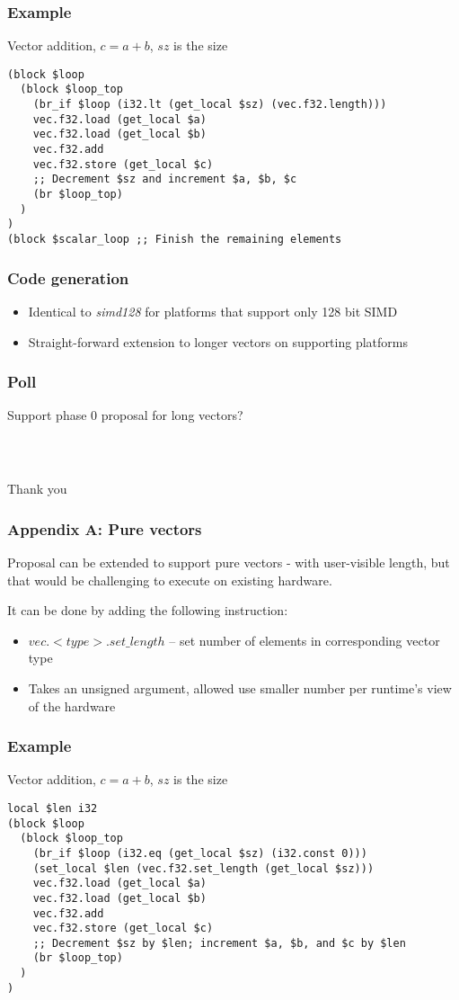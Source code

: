 \documentclass[t,aspectratio=169, xcolor={table}]{beamer}
\begin{document}
\begin{frame}[containsverbatim]
\frametitle{Example}
Vector addition, $c = a + b$, $sz$ is the size
\begin{lstlisting}
(block $loop
  (block $loop_top
    (br_if $loop (i32.lt (get_local $sz) (vec.f32.length)))
    vec.f32.load (get_local $a)
    vec.f32.load (get_local $b)
    vec.f32.add
    vec.f32.store (get_local $c)
    ;; Decrement $sz and increment $a, $b, $c
    (br $loop_top)
  )
)
(block $scalar_loop ;; Finish the remaining elements
\end{lstlisting}
\end{frame}
\begin{frame}
\frametitle{Code generation}
  \begin{itemize}
  \item Identical to \textit{simd128} for platforms that support only 128 bit SIMD
  \item Straight-forward extension to longer vectors on supporting platforms
  \end{itemize}
\end{frame}
\begin{frame}
\frametitle{Poll}
Support phase 0 proposal for long vectors?
\end{frame}
\begin{frame}
\frametitle{~}
\huge{Thank you}
\end{frame}
\begin{frame}
\frametitle{Appendix A: Pure vectors}
  Proposal can be extended to support pure vectors - with user-visible length, but that would be challenging to execute on existing hardware.

  It can be done by adding the following instruction:

  \begin{itemize}
  \item $vec.<type>.set\_length$ -- set number of elements in corresponding vector type
  \item[] Takes an unsigned argument, allowed use smaller number per runtime's view of the hardware
  \end{itemize}
\end{frame}
\begin{frame}[containsverbatim]
\frametitle{Example}
Vector addition, $c = a + b$, $sz$ is the size
\begin{lstlisting}
local $len i32
(block $loop
  (block $loop_top
    (br_if $loop (i32.eq (get_local $sz) (i32.const 0)))
    (set_local $len (vec.f32.set_length (get_local $sz)))
    vec.f32.load (get_local $a)
    vec.f32.load (get_local $b)
    vec.f32.add
    vec.f32.store (get_local $c)
    ;; Decrement $sz by $len; increment $a, $b, and $c by $len
    (br $loop_top)
  )
)
\end{lstlisting}
\end{frame}
\end{document}
